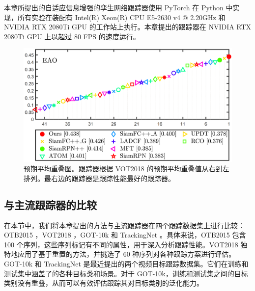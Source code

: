 本章所提出的自适应信息增强的孪生网络跟踪器使用 PyTorch 在 Python 中实现，所有实验在装配有 Intel(R) Xeon(R) CPU E5-2630 v4 @ 2.20GHz
和 NVIDIA RTX 2080Ti GPU 的工作站上执行。本章提出的跟踪器在 NVIDIA RTX 2080Ti GPU 上以超过 80 FPS 的速度运行。

\begin{figure}[t]
    \centering
    \includegraphics[width=1.0\textwidth]{Img/MTP/vot18/vot18_eao.png}
    \caption{预期平均重叠图。跟踪器根据 VOT2018 的预期平均重叠值从右到左排列。最右边的跟踪器是跟踪性能最好的跟踪器。}
    \label{fig:eao}
\end{figure}


\subsection{与主流跟踪器的比较}

在本节中，我们将本章提出的方法与主流跟踪器在四个跟踪数据集上进行比较：OTB2015 \cite{OTB}，VOT2018 \cite{kristan2018sixth}，GOT-10k \cite{GOT-10k} 和 TrackingNet \cite{muller2018trackingnet}。具体来说，OTB2015 \cite{OTB} 包含 100 个序列，这些序列标记有不同的属性，用于深入分析跟踪性能。VOT2018 \cite{kristan2018sixth} 独特地应用了基于重置的方法，并挑选了 60 种序列对各种跟踪方案进行评估。GOT-10k \cite{GOT-10k} 和 TrackingNet \cite{muller2018trackingnet} 是最近提出的两个视频目标跟踪数据集。它们在训练和测试集中涵盖了的各种目标类和场景。对于 GOT-10k，训练和测试集之间的目标类别没有重叠，从而可以有效评估跟踪其对目标类别的泛化能力。

